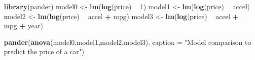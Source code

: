 \documentclass[]{article}
\newenvironment{Shaded}{\begin{snugshade}}{\end{snugshade}}
\newcommand{\KeywordTok}[1]{\textcolor[rgb]{0.13,0.29,0.53}{\textbf{#1}}}
\newcommand{\DataTypeTok}[1]{\textcolor[rgb]{0.13,0.29,0.53}{#1}}
\newcommand{\DecValTok}[1]{\textcolor[rgb]{0.00,0.00,0.81}{#1}}
\newcommand{\StringTok}[1]{\textcolor[rgb]{0.31,0.60,0.02}{#1}}
\newcommand{\OperatorTok}[1]{\textcolor[rgb]{0.81,0.36,0.00}{\textbf{#1}}}
\newcommand{\NormalTok}[1]{#1}
\begin{document}
\begin{Shaded}
\begin{Highlighting}[]
\KeywordTok{library}\NormalTok{(pander)}
\NormalTok{model0 <-}\StringTok{ }\KeywordTok{lm}\NormalTok{(}\KeywordTok{log}\NormalTok{(price) }\OperatorTok{~}\StringTok{ }\DecValTok{1}\NormalTok{)}
\NormalTok{model1 <-}\StringTok{ }\KeywordTok{lm}\NormalTok{(}\KeywordTok{log}\NormalTok{(price) }\OperatorTok{~}\StringTok{ }\NormalTok{accel)}
\NormalTok{model2 <-}\StringTok{ }\KeywordTok{lm}\NormalTok{(}\KeywordTok{log}\NormalTok{(price) }\OperatorTok{~}\StringTok{ }\NormalTok{accel }\OperatorTok{+}\StringTok{ }\NormalTok{mpg)}
\NormalTok{model3 <-}\StringTok{ }\KeywordTok{lm}\NormalTok{(}\KeywordTok{log}\NormalTok{(price) }\OperatorTok{~}\StringTok{ }\NormalTok{accel }\OperatorTok{+}\StringTok{ }\NormalTok{mpg }\OperatorTok{+}\StringTok{ }\NormalTok{year)}

\KeywordTok{pander}\NormalTok{(}\KeywordTok{anova}\NormalTok{(model0,model1,model2,model3), }
       \DataTypeTok{caption =} \StringTok{"Model comparison to predict the price of a car"}\NormalTok{)}
\end{Highlighting}
\end{Shaded}
\end{document}
